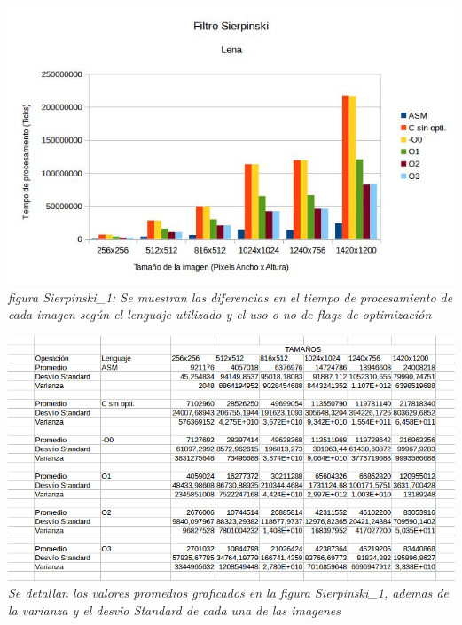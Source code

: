\documentclass[a4paper]{article}
\begin{document}
\vspace{1cm}
\includegraphics[width=\textwidth,height=\textheight,keepaspectratio
]{sierppri.jpg}
\textit{figura Sierpinski\_1: Se muestran las diferencias en el tiempo de procesamiento de cada imagen según el lenguaje utilizado y el uso o no de flags de optimización} \newline \newline


\includegraphics[width=\textwidth,height=\textheight,keepaspectratio
]{flags.jpg}
\textit{Se detallan los valores promedios graficados en la figura Sierpinski\_1, ademas de la varianza y el desvio Standard de cada una de las imagenes}\newline \newline
\end{document}
